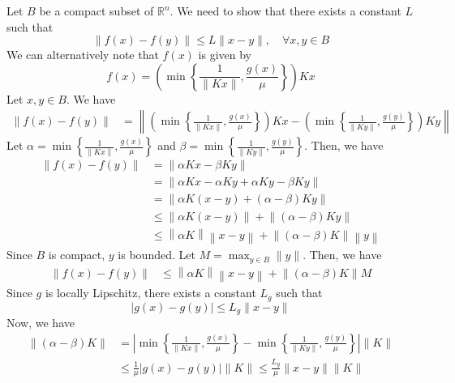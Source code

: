 Let \( B \) be a compact subset of \( \mathbb{R}^{n} \).
We need to show that there exists a constant \( L \) such that
\begin{equation*}
    \|f(x)-f(y)\| \leq L\|x-y\|, \quad \forall x, y \in B
\end{equation*}
We can alternatively note that \( f(x) \) is given by
\begin{equation*}
    f(x)
    =
    \left( \min \left \{ \frac{1}{\|K x\|}, \frac{g(x)}{\mu} \right \} \right) K x
\end{equation*}
Let \( x, y \in B \).
We have
\begin{align*}
    \|f(x)-f(y)\|
     & =
    \left \|
    \left( \min \left \{ \frac{1}{\|K x\|}, \frac{g(x)}{\mu} \right \} \right) K x
    -
    \left( \min \left \{ \frac{1}{\|K y\|}, \frac{g(y)}{\mu} \right \} \right) K y
    \right \|
\end{align*}
Let \( \alpha = \min \left \{ \frac{1}{\|K x\|}, \frac{g(x)}{\mu} \right \} \) and \( \beta = \min \left \{ \frac{1}{\|K y\|}, \frac{g(y)}{\mu} \right \} \).
Then, we have
\begin{align*}
    \|f(x)-f(y)\|
     & =
    \left \|
    \alpha K x - \beta K y
    \right \|
    \\
     & =
    \left \|
    \alpha K x - \alpha K y + \alpha K y - \beta K y
    \right \|
    \\
     & =
    \left \|
    \alpha K (x - y) + (\alpha - \beta) K y
    \right \|
    \\
     & \leq
    \left \|
    \alpha K (x - y)
    \right \|
    +
    \left \|
    (\alpha - \beta) K y
    \right \|
    \\
     & \leq
    \left \|
    \alpha K
    \right \|
    \left \|
    x - y
    \right \|
    +
    \left \|
    (\alpha - \beta) K
    \right \|
    \left \|
    y
    \right \|
\end{align*}
Since \( B \) is compact, \( y \) is bounded.
Let \( M = \max_{y \in B} \|y\| \).
Then, we have
\begin{align*}
    \|f(x)-f(y)\|
     & \leq
    \left \|
    \alpha K
    \right \|
    \left \|
    x - y
    \right \|
    +
    \left \|
    (\alpha - \beta) K
    \right \|
    M
\end{align*}
Since \( g \) is locally Lipschitz, there exists a constant \( L_{g} \) such that
\begin{equation*}
    |g(x) - g(y)| \leq L_{g} \|x - y\|
\end{equation*}
Now, we have
\begin{align*}
    \| (\alpha - \beta)K \|
     & =
    \left |
    \min \left \{ \frac{1}{\|K x\|}, \frac{g(x)}{\mu} \right \}
    -
    \min \left \{ \frac{1}{\|K y\|}, \frac{g(y)}{\mu} \right \}
    \right | \|K\|
    \\ & \leq
    \frac{1}{\mu} \left| g(x) - g(y) \right| \|K\|
    \leq
    \frac{L_{g}}{\mu} \|x - y\| \|K\|
\end{align*}
